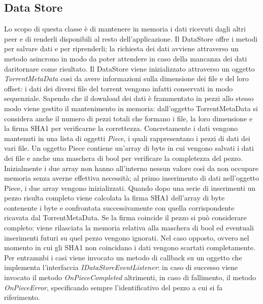 \documentclass[a4]{book}
\begin{document}
\subsection{Data Store}
Lo scopo di questa classe è di mantenere in memoria i dati ricevuti dagli altri peer e di renderli disponibili al resto dell'applicazione. Il DataStore offre i metodi per salvare dati e per riprenderli; la richiesta dei dati avviene attraverso un metodo asincrono in modo da poter attendere in caso della mancanza dei dati daritornare come risultato.\newline\newline
Il DataStore viene inizializzato attraverso un oggetto \textit{TorrentMetaData} cosi da avere informazioni sulla dimensione dei file e del loro offset: i dati dei diversi file del torrent vengono infatti conservati in modo sequenziale.\newline
Sapendo che il download dei dati è frammentato in pezzi allo stesso modo viene gestito il mantenimento in memoria: dall'oggetto TorrentMetaData si considera anche il numero di pezzi totali che formano i file, la loro dimensione e la firma SHA1 per verificarne la correttezza.\newline
Concretamente i dati vengono mantenuti in una lista di oggetti \textit{Piece}, i quali rappresentano i pezzi di dati dei vari file. Un oggetto Piece contiene un'array di byte in cui vengono salvati i dati dei file e anche una maschera di bool per verificare la completezza del pezzo. Inizialmente i due array non hanno all'interno nessun valore così da non occupare memoria senza averne effettiva necessità; al primo inserimento di dati nell'oggetto Piece, i due array vengono inizializzati.\newline
Quando dopo una serie di inserimenti un pezzo risulta completo viene calcolata la firma SHA1 dell'array di byte contenente i byte e confrontata successivamente con quella corrispondente ricavata dal TorrentMetaData. Se la firma coincide il pezzo si può considerare completo: viene rilasciata la memoria relativa alla maschera di bool ed eventuali inserimenti futuri su quel pezzo vengono ignorati. Nel caso opposto, ovvero nel momento in cui gli SHA1 non coincidano i dati vengono scartati completamente.\newline
Per entramnbi i casi viene invocato un metodo di callback su un oggetto che implementa l'interfaccia \textit{IDataStoreEventListener}: in caso di successo viene invocato il metodo \textit{OnPieceCompleted} altrimenti, in caso di fallimento, il metodo \textit{OnPieceError}, specificando sempre l'identificativo del pezzo a cui si fa riferimento.\newline
\end{document}
